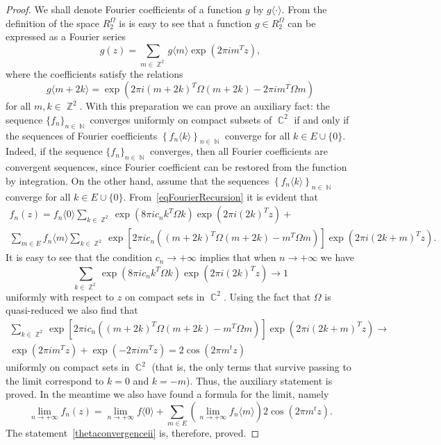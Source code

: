 \documentclass[10pt,a4paper]{amsart}
\DeclareMathOperator{\CC}{\mathbb C}
\DeclareMathOperator{\NN}{\mathbb N}
\DeclareMathOperator{\ZZ}{\mathbb Z}
\begin{document}
	\begin{proof}
		We shall denote Fourier coefficients of a function $g$ by $g\langle\cdot\rangle$. From the definition of the space $R_2^\Omega$ is is easy to see that a function $g \in R_2^\Omega$ can be expressed as a Fourier series
		\[
		g(z) = \sum_{m \in \ZZ^2}g\langle m\rangle \exp\left(2\pi i m^Tz\right),
		\]
		where the coefficients satisfy the relations
		\begin{equation}\label{eqFourierRecursion}
			g\langle m + 2k\rangle = \exp\left(2\pi i(m+ 2k)^T\Omega(m+ 2k) - 2\pi im^T\Omega m\right)
		\end{equation}
		for all $m,k \in \ZZ^2$. With this preparation we can prove an auxiliary fact: the sequence $\{f_n\}_{n \in \NN}$ converges uniformly on compact subsets of $\CC^2$ if and only if the sequences of Fourier coefficients $\left\{f_n\langle k\rangle \right\}_{n \in \NN}$ converge for all $k \in E \cup \{0\}$. Indeed, if the sequence $\{f_n\}_{n \in \NN}$ converges, then all Fourier coefficients are convergent sequences, since Fourier coefficient can be restored from the function by integration. On the other hand, assume that the sequences $\left\{f_n\langle k\rangle \right\}_{n \in \NN}$ converge for all $k \in E \cup \{0\}$. From~\eqref{eqFourierRecursion} it is evident that
		\begin{multline}\label{eqFourierExpansion}
			f_n(z) = f_n\langle 0\rangle\sum_{k \in \ZZ^2}\exp\left(8\pi ic_nk^T\Omega k\right)\exp\left(2\pi i (2k)^Tz\right) + \\ \sum_{m \in E} f_n\langle m\rangle \sum_{k \in \ZZ^2}\exp\left[2\pi ic_n\left((m+ 2k)^T\Omega(m+ 2k) - m^T\Omega m\right)\right]\exp(2\pi i(2k + m)^Tz).
		\end{multline}
		It is easy to see that the condition $c_n \to +\infty$ implies that when $n \to +\infty$ we have
		\[
		\sum_{k \in \ZZ^2}\exp\left(8\pi ic_nk^T\Omega k\right)\exp\left(2\pi i (2k)^Tz\right) \to 1
		\]
		uniformly with respect to $z$ on compact sets in $\CC^2$. Using the fact that $\Omega$ is quasi-reduced we also find that
		\begin{multline*}
			\sum_{k \in \ZZ^2}\exp\left[2\pi ic_n\left((m+ 2k)^T\Omega(m+ 2k) - m^T\Omega m\right)\right]\exp(2\pi i(2k + m)^Tz) \to \\ \exp(2\pi i m^Tz) + \exp(-2\pi i m^Tz) = 2\cos(2\pi m^tz)
		\end{multline*}
		uniformly on compact sets in $\CC^2$ (that is, the only terms that survive passing to the limit correspond to $k = 0$ and $k = -m$). Thus, the auxiliary statement is proved. In the meantime we also have found a formula for the limit, namely
		\[
		\lim_{n \to +\infty} f_n(z) = \lim_{n \to +\infty} f\langle 0\rangle  + \sum_{m \in E}\left(\lim_{n \to +\infty} f_n\langle m \rangle\right)2\cos(2\pi m^tz).
		\]
		The statement~\ref{thetaconvergenceii} is, therefore, proved.
		

\end{proof}
\end{document}
